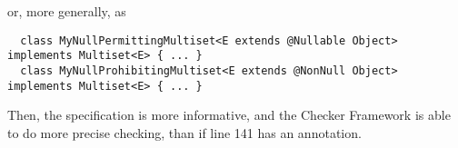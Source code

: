 \noindent
or, more generally, as

\begin{Verbatim}
  class MyNullPermittingMultiset<E extends @Nullable Object> implements Multiset<E> { ... }
  class MyNullProhibitingMultiset<E extends @NonNull Object> implements Multiset<E> { ... }
\end{Verbatim}

Then, the specification is more informative, and the Checker Framework is
able to do more precise checking, than if line 141 has an annotation.


